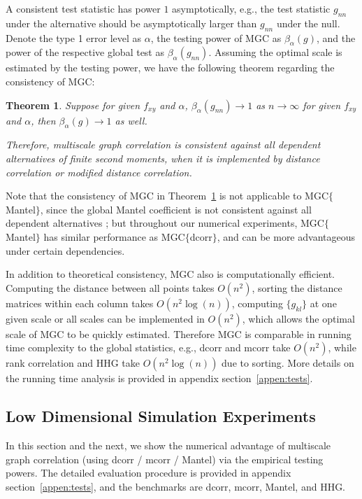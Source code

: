 \documentclass[11pt]{article}
\newtheorem{thm}{Theorem}
\begin{document}
A consistent test statistic has power $1$ asymptotically, e.g., the test statistic $g_{nn}$ under the alternative should be asymptotically larger than $g_{nn}$ under the null. Denote the type 1 error level as $\alpha$, the testing power of MGC as $\beta_{\alpha}(g)$, and the power of the respective global test as $\beta_{\alpha}(g_{nn})$. Assuming the optimal scale is estimated by the testing power, we have the following theorem regarding the consistency of MGC:
\begin{thm}
\label{thm1}
Suppose for given $f_{xy}$ and $\alpha$, $\beta_{\alpha}(g_{nn}) \rightarrow 1$ as $n \rightarrow \infty$ for given $f_{xy}$ and $\alpha$, then $\beta_{\alpha}(g) \rightarrow 1$ as well.

Therefore, multiscale graph correlation is consistent against all dependent alternatives of finite second moments, when it is implemented by distance correlation or modified distance correlation.
\end{thm}

Note that the consistency of MGC in Theorem~\ref{thm1} is not applicable to MGC$\{$Mantel$\}$, since the global Mantel coefficient is not consistent against all dependent alternatives \cite{JosseHolmes2013}; but throughout our numerical experiments, MGC$\{$Mantel$\}$ has similar performance as MGC$\{$dcorr$\}$, and can be more advantageous under certain dependencies.

In addition to theoretical consistency, MGC also is computationally efficient. Computing the distance between all points takes $O(n^2)$, sorting the distance matrices within each column takes $O(n^2\log(n))$, computing $\{g_{kl}\}$ at one given scale or all scales can be implemented in $O(n^2)$, which allows the optimal scale of MGC to be quickly estimated. Therefore MGC is comparable in running time complexity to the global statistics, e.g., dcorr and mcorr take $O(n^2)$, while rank correlation and HHG take $O(n^2\log(n))$ due to sorting. More details on the running time analysis is provided in appendix section~\ref{appen:tests}.

\subsection{Low Dimensional Simulation Experiments}
\label{numer1}
In this section and the next, we show the numerical advantage of multiscale graph correlation (using dcorr / mcorr / Mantel) via the empirical testing powers. The detailed evaluation procedure is provided in appendix section~\ref{appen:tests}, and the benchmarks are dcorr, mcorr, Mantel, and HHG.
\end{document}
